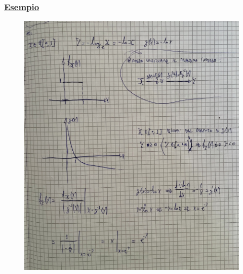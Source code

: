 \documentclass{article}
\begin{document}
\subsubsection{\underline{Esempio}}
\begin{figure}[ht]
\centering
\includegraphics[scale=0.16]{ese/26.jpeg}
\end{figure}
\end{document}
